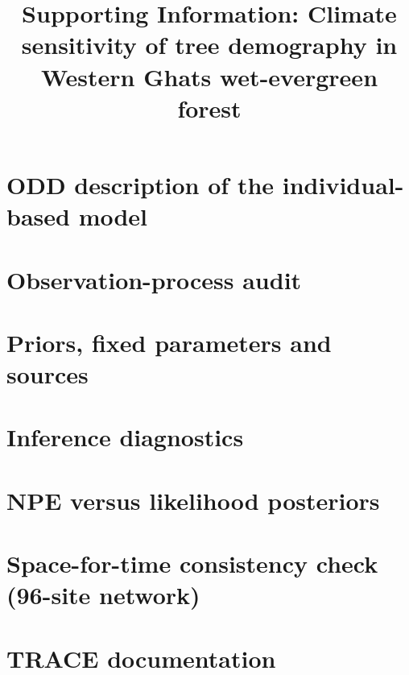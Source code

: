 \documentclass[11pt]{article}
\title{Supporting Information: Climate sensitivity of tree demography in Western Ghats wet-evergreen forest}
\author{}
\date{}
\begin{document}
\maketitle

\section{ODD description of the individual-based model}\label{sec:odd}

\section{Observation-process audit}\label{sec:obs}

\section{Priors, fixed parameters and sources}\label{sec:priors}

\section{Inference diagnostics}\label{sec:diagnostics}

\section{NPE versus likelihood posteriors}\label{sec:npe-vs-likelihood}

\section{Space-for-time consistency check (96-site network)}\label{sec:cwg96}

\section{TRACE documentation}\label{sec:trace}



\end{document}
